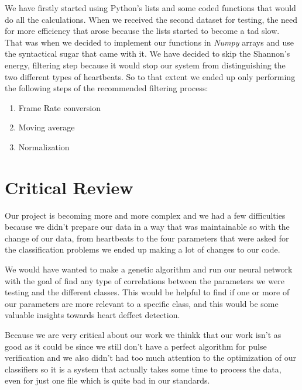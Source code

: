 \documentclass[conference]{IEEEtran}
\begin{document}
We have firstly started using Python's lists and some coded functions that would
do all the calculations. When we received the second dataset for testing, the
need for more efficiency that arose because the lists started to become a tad
slow. That was when we decided to implement our functions in \textit{Numpy}
arrays and use the syntactical sugar that came with it. We have decided to
skip the Shannon's energy, filtering step because it would stop our system from
distinguishing the two different types of heartbeats. So to that extent we
ended up only performing the following steps of the recommended filtering
process:
\begin{enumerate}
	\item Frame Rate conversion
	\item Moving average
	\item Normalization
\end{enumerate}

\section{Critical Review}
Our project is becoming more and more complex and we had a few difficulties
because we didn't prepare our data in a way that was maintainable so with the
change of our data, from heartbeats to the four parameters that were asked for
the classification problems we ended up making a lot of changes to our code.

We would have wanted to make a genetic algorithm and run our neural network with
the goal of find any type of correlations between the parameters we were testing
and the different classes. This would be helpful to find if one or more of our
parameters are more relevant to a specific class, and this would be some
valuable insights towards heart deffect detection.

Because we are very critical about our work we thinkk that our work isn't as
good as it could be since we still don't have a perfect algorithm for pulse
verification and we also didn't had too much attention to the optimization of
our classifiers so it is a system that actually takes some time to process the
data, even for just one file which is quite bad in our standards.
\end{document}

